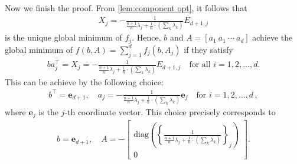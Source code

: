 \documentclass{article}
\newcommand{\bb}{A}
\newcommand{\bbb}{a}
\newcommand{\cc}{b}
\newcommand{\e}{\mathbf{e}}
\begin{document}
Now we finish the proof. 
From \autoref{lem:component opt}, it follows that 
\begin{align}  
X_j = - \frac{1}{  \frac{n+1}{n}  \lambda_j +   \frac{1}{n} \cdot \left( \sum_k \lambda_k  \right)   } E_{d+1,j}
\end{align} 
is the unique global minimum of $f_j$.
Hence, $\cc$ and $\bb = [\bbb_1\ \bbb_1 \ \cdots \ \bbb_d ]$ achieve the global minimum of $f(\cc,\bb)=\sum_{j=1}^d f_j(\cc,\bb_j)$ if they satisfy
\begin{align}
\cc\bbb_j^\top =   X_j = - \frac{1}{  \frac{n+1}{n}  \lambda_j +   \frac{1}{n} \cdot \left( \sum_k \lambda_k  \right)   } E_{d+1,j}\quad \text{for all }i=1,2,\dots,d. 
\end{align}
This can be achieve by the following choice:
\begin{align}  
\cc^\top = \e_{d+1}  ,\quad \bbb_j =     -  \frac{1}{  \frac{n+1}{n}  \lambda_j +   \frac{1}{n} \cdot \left( \sum_k \lambda_k  \right)   } \e_j \quad \text{for }i=1,2,\dots,d\,,
\end{align} 
where $\e_j$ is the $j$-th coordinate vector. This choice precisely corresponds to 
\begin{align}
\cc = \e_{d+1},\quad \bb =  - \begin{bmatrix}
\mathrm{diag}\left(\left\{\frac{1}{  \frac{n+1}{n}  \lambda_j +   \frac{1}{n} \cdot \left( \sum_k \lambda_k  \right)   } \right\}_j\right)   \\
0  
\end{bmatrix} .
\end{align}
\end{document}
